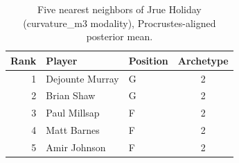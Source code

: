 \begin{table}[htbp]
  \centering\small
  \begin{tabular}{rllc}
    \toprule
    Rank & Player & Position & Archetype \\
    \midrule
    1 & Dejounte Murray & G & 2 \\
    2 & Brian Shaw & G & 2 \\
    3 & Paul Millsap & F & 2 \\
    4 & Matt Barnes & F & 2 \\
    5 & Amir Johnson & F & 2 \\
    \bottomrule
  \end{tabular}
  \caption{Five nearest neighbors of Jrue Holiday (curvature_m3 modality), Procrustes-aligned posterior mean.}
  \label{tab:Jrue_Holiday_neighbors_curvature_m3}
\end{table}

